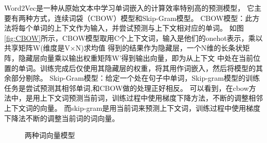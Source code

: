 Word2Vec是一种从原始文本中学习单词嵌入的计算效率特别高的预测模型，
它主要有两种方式，连续词袋（CBOW）模型和Skip-Gram模型。
CBOW模型：此方法将每个单词的上下文作为输入，并尝试预测与上下文相对应的单词。
如图\ref{fig:CBOW}所示，CBOW模型取用C个上下文词，输入是他们的onehot表示，乘以共享矩阵W(维度是V×N)求均值
得到的结果作为隐藏层，一个N维的长条状矩阵，隐藏层向量乘以输出权重矩阵W'得到输出向量，即为从上下文
中处在当前位置的单词。训练完成后仅使用其隐藏层的权重，将其用作词嵌入，然后将模型的其余部分剔除。
Skip-Gram模型：给定一个处在句子中单词，Skip-gram模型的训练任务是尝试预测其相邻单词,和CBOW做的处理正好相反。
可以看到，在cbow方法中，是用上下文词预测当前词，训练过程中使用梯度下降方法，不断的调整相邻上下文词的向量。
而skip-gram是用当前词来预测上下文词，训练过程中使用梯度下降法不断的调整当前词的词向量。

\begin{figure}[htbp]
  \caption{两种词向量模型\cite{mikolov2013distributed}}
  \end{figure}

